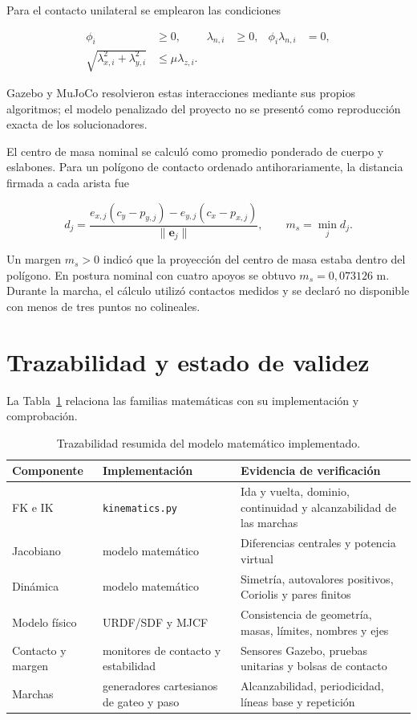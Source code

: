 Para el contacto unilateral se emplearon las condiciones

\begin{align}
\phi_i&\geq0,&\lambda_{n,i}&\geq0,&\phi_i\lambda_{n,i}&=0,\\
\sqrt{\lambda_{x,i}^2+\lambda_{y,i}^2}&\leq\mu\lambda_{z,i}.
\label{eq:nova-contact}
\end{align}

Gazebo y MuJoCo resolvieron estas interacciones mediante sus propios algoritmos;
el modelo penalizado del proyecto no se presentó como reproducción exacta de
los solucionadores.

El centro de masa nominal se calculó como promedio ponderado de cuerpo y
eslabones. Para un polígono de contacto ordenado antihorariamente, la distancia
firmada a cada arista fue

\begin{equation}
d_j=\frac{e_{x,j}(c_y-p_{y,j})-e_{y,j}(c_x-p_{x,j})}
{\|\mathbf e_j\|},
\qquad m_s=\min_jd_j.
\label{eq:nova-static-margin}
\end{equation}

Un margen $m_s>0$ indicó que la proyección del centro de masa estaba dentro del
polígono. En postura nominal con cuatro apoyos se obtuvo
$m_s=0,073126$ m. Durante la marcha, el cálculo utilizó contactos medidos y se
declaró no disponible con menos de tres puntos no colineales.

\section{Trazabilidad y estado de validez}

La Tabla~\ref{tab:model-traceability} relaciona las familias matemáticas con su
implementación y comprobación.

\begin{table}[H]
\centering
\caption{Trazabilidad resumida del modelo matemático implementado.}
\label{tab:model-traceability}
\footnotesize
\begin{tabular}{>{\raggedright\arraybackslash}p{2.3cm}
>{\raggedright\arraybackslash}p{3.8cm}
>{\raggedright\arraybackslash}p{5.2cm}}
\toprule
Componente & Implementación & Evidencia de verificación \\
\midrule
FK e IK & \texttt{kinematics.py} & Ida y vuelta, dominio, continuidad y
alcanzabilidad de las marchas \\
Jacobiano & modelo matemático & Diferencias centrales y potencia
virtual \\
Dinámica & modelo matemático & Simetría, autovalores positivos,
Coriolis y pares finitos \\
Modelo físico & URDF/SDF y MJCF & Consistencia de geometría, masas, límites,
nombres y ejes \\
Contacto y margen & monitores de contacto y estabilidad & Sensores Gazebo,
pruebas unitarias y bolsas
de contacto \\
Marchas & generadores cartesianos de gateo y paso &
Alcanzabilidad, periodicidad, líneas base y repetición \\
\bottomrule
\end{tabular}
\end{table}

